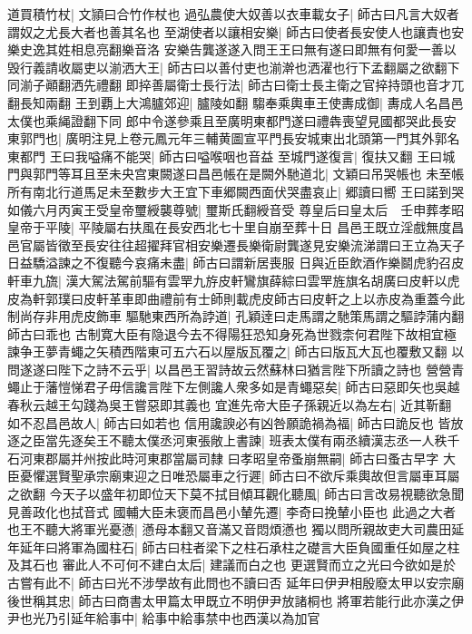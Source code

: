 道買積竹杖|{
	文頴曰合竹作杖也}
過弘農使大奴善以衣車載女子|{
	師古曰凡言大奴者謂奴之尤長大者也善其名也}
至湖使者以讓相安樂|{
	師古曰使者長安使人也讓責也安樂史逸其姓相息亮翻樂音洛}
安樂告龔遂遂入問王王曰無有遂曰即無有何愛一善以毁行義請收屬吏以湔洒大王|{
	師古曰以善付吏也湔澣也洒濯也行下孟翻屬之欲翻下同湔子顚翻洒先禮翻}
即捽善屬衛士長行法|{
	師古曰衛士長主衛之官捽持頭也音才兀翻長知兩翻}
王到覇上大鴻臚郊迎|{
	臚陵如翻}
騶奉乘輿車王使夀成御|{
	夀成人名昌邑太僕也乘䋲證翻下同}
郎中令遂參乘且至廣明東都門遂曰禮犇喪望見國都哭此長安東郭門也|{
	廣明注見上卷元鳳元年三輔黄圖宣平門長安城東出北頭第一門其外郭名東都門}
王曰我嗌痛不能哭|{
	師古曰嗌喉咽也音益}
至城門遂復言|{
	復扶又翻}
王曰城門與郭門等耳且至未央宫東闕遂曰昌邑帳在是闕外馳道北|{
	文穎曰吊哭帳也}
未至帳所有南北行道馬足未至數步大王宜下車郷闕西面伏哭盡哀止|{
	郷讀曰嚮}
王曰諾到哭如儀六月丙寅王受皇帝璽綬襲尊號|{
	璽斯氏翻綬音受}
尊皇后曰皇太后　壬申葬孝昭皇帝于平陵|{
	平陵屬右扶風在長安西北七十里自崩至葬十日}
昌邑王既立淫戲無度昌邑官屬皆徵至長安往往超擢拜官相安樂遷長樂衛尉龔遂見安樂流涕謂曰王立為天子日益驕溢諫之不復聽今哀痛未盡|{
	師古曰謂新居喪服}
日與近臣飲酒作樂鬬虎豹召皮軒車九旒|{
	漢大駕法駕前驅有雲䍐九斿皮軒鸞旗薛綜曰雲䍐旌旗名胡廣曰皮軒以虎皮為軒郭璞曰皮軒革車即曲禮前有士師則載虎皮師古曰皮軒之上以赤皮為重蓋今此制尚存非用虎皮飾車}
驅馳東西所為誖道|{
	孔穎逹曰走馬謂之馳策馬謂之驅誖蒲内翻師古曰乖也}
古制寛大臣有隐退今去不得陽狂恐知身死為世戮柰何君陛下故相宜極諫争王夢青蠅之矢積西階東可五六石以屋版瓦覆之|{
	師古曰版瓦大瓦也覆敷又翻}
以問遂遂曰陛下之詩不云乎|{
	以昌邑王習詩故云然蘇林曰猶言陛下所讀之詩也}
營營青蠅止于藩愷悌君子毋信讒言陛下左側讒人衆多如是青蠅惡矣|{
	師古曰惡即矢也吳越春秋云越王勾踐為吳王嘗惡即其義也}
宜進先帝大臣子孫親近以為左右|{
	近其靳翻}
如不忍昌邑故人|{
	師古曰如若也}
信用讒諛必有凶咎願詭禍為福|{
	師古曰詭反也}
皆放逐之臣當先逐矣王不聽太僕丞河東張敞上書諫|{
	班表太僕有兩丞續漢志丞一人秩千石河東郡屬并州按此時河東郡當屬司隸}
曰孝昭皇帝蚤崩無嗣|{
	師古曰蚤古早字}
大臣憂懼選賢聖承宗廟東迎之日唯恐屬車之行遲|{
	師古曰不欲斥乘輿故但言屬車耳屬之欲翻}
今天子以盛年初即位天下莫不拭目傾耳觀化聽風|{
	師古曰言改易視聽欲急聞見善政化也拭音式}
國輔大臣未褒而昌邑小輦先遷|{
	李奇曰挽輦小臣也}
此過之大者也王不聽大將軍光憂懣|{
	懣母本翻又音滿又音悶煩懣也}
獨以問所親故吏大司農田延年延年曰將軍為國柱石|{
	師古曰柱者梁下之柱石承柱之礎言大臣負國重任如屋之柱及其石也}
審此人不可何不建白太后|{
	建議而白之也}
更選賢而立之光曰今欲如是於古嘗有此不|{
	師古曰光不涉學故有此問也不讀曰否}
延年曰伊尹相殷廢太甲以安宗廟後世稱其忠|{
	師古曰商書太甲篇太甲既立不明伊尹放諸桐也}
將軍若能行此亦漢之伊尹也光乃引延年給事中|{
	給事中給事禁中也西漢以為加官}
